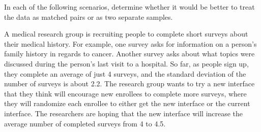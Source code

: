 \documentclass[11pt,answers]{exam}
\begin{document}
\begin{questions}
\question[6] In each of the following scenarios, determine whether it would be better to treat the data as matched pairs or as two separate samples.   

\newpage
\question A medical research group is recruiting people to complete short surveys
about their medical history. For example, one survey asks for information on a person's family history in
regards to cancer. Another survey asks about what topics were discussed during the person's last visit to a
hospital. So far, as people sign up, they complete an average of just 4 surveys, and the standard deviation
of the number of surveys is about 2.2. The research group wants to try a new interface that they think will
encourage new enrollees to complete more surveys, where they will randomize each enrollee to either get the
new interface or the current interface. The researchers are hoping that the new interface will increase the average number of completed surveys from 4 to 4.5.  
\begin{parts}

\end{parts}
\end{questions}
\end{document}
